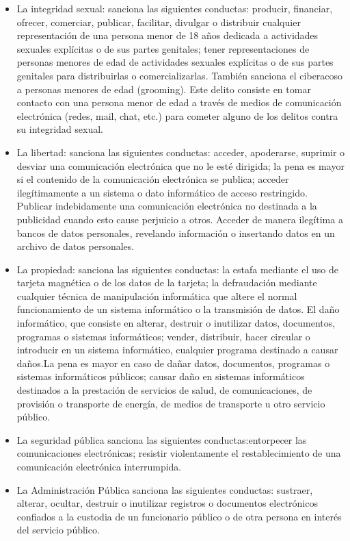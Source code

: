 \documentclass[a4paper,12pt]{article}
\begin{document}
    \begin{itemize}
        \item La integridad sexual: sanciona las siguientes conductas: producir, financiar, ofrecer, comerciar, publicar, facilitar, divulgar o distribuir cualquier representación de una persona menor de 18 años dedicada a actividades sexuales explícitas o de sus partes genitales; tener representaciones de personas menores de edad de actividades sexuales explícitas o de sus partes genitales para distribuirlas o comercializarlas. También sanciona el ciberacoso a personas menores de edad (grooming). Este delito consiste en tomar contacto con una persona menor de edad a través de medios de comunicación electrónica (redes, mail, chat, etc.) para cometer alguno de los delitos contra su integridad sexual.
        \item La libertad: sanciona las siguientes conductas: acceder, apoderarse, suprimir o desviar una comunicación electrónica que no le esté dirigida; la pena es mayor si el contenido de la comunicación electrónica se publica; acceder ilegítimamente a un sistema o dato informático de acceso restringido. Publicar indebidamente una comunicación electrónica no destinada a la publicidad cuando esto cause perjuicio a otros. Acceder de manera ilegítima a bancos de datos personales, revelando información o insertando datos en un archivo de datos personales.
        \item La propiedad: sanciona las siguientes conductas: la estafa mediante el uso de tarjeta magnética o de los datos de la tarjeta; la defraudación mediante cualquier técnica de manipulación informática que altere el normal funcionamiento de un sistema informático o la transmisión de datos. El daño informático, que consiste en alterar, destruir o inutilizar datos, documentos, programas o sistemas informáticos; vender, distribuir, hacer circular o introducir en un sistema informático, cualquier programa destinado a causar daños.La pena es mayor en caso de dañar datos, documentos, programas o sistemas informáticos públicos; causar daño en sistemas informáticos destinados a la prestación de servicios de salud, de comunicaciones, de provisión o transporte de energía, de medios de transporte u otro servicio público.
        \item La seguridad pública sanciona las siguientes conductas:entorpecer las comunicaciones electrónicas; resistir violentamente el restablecimiento de una comunicación electrónica interrumpida.
        \item La Administración Pública sanciona las siguientes conductas: sustraer, alterar, ocultar, destruir o inutilizar registros o documentos electrónicos confiados a la custodia de un funcionario público o de otra persona en interés del servicio público.
    \end{itemize} 
\end{document}
